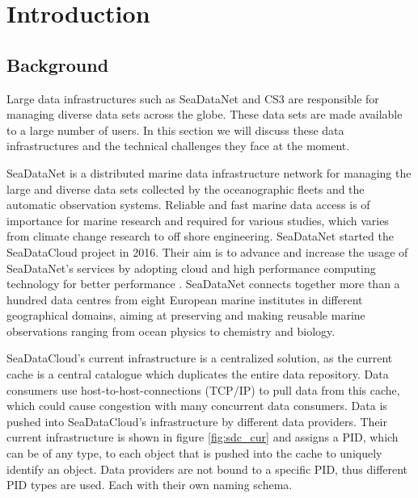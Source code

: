 \section{Introduction}

\subsection{Background}
\label{introduction-background}

Large data infrastructures such as SeaDataNet and CS3 are responsible for managing diverse data sets across the globe. These data sets are made available to a large number of users. In this section we will discuss these data infrastructures and the technical challenges they face at the moment.

SeaDataNet is a distributed marine data infrastructure network for managing the large and diverse data sets collected by the oceanographic fleets and the automatic observation systems. Reliable and fast marine data access is of importance for marine research and required for various studies, which varies from climate change research to off shore engineering. SeaDataNet started the SeaDataCloud project in 2016. Their aim is to advance and increase the usage of SeaDataNet's services by adopting cloud and high performance computing technology for better performance \cite{sdc}. SeaDataNet connects together more than a hundred data centres from eight European marine institutes in different geographical domains, aiming at preserving and making reusable marine observations ranging from ocean physics to chemistry and biology.

SeaDataCloud's current infrastructure is a centralized solution, as the current cache is a central catalogue which duplicates the entire data repository. Data consumers use host-to-host-connections (TCP/IP) to pull data from this cache, which could cause congestion with many concurrent data consumers. Data is pushed into SeaDataCloud's infrastructure by different data providers. Their current infrastructure is shown in figure \ref{fig:sdc_cur} and assigns a PID, which can be of any type, to each object that is pushed into the cache to uniquely identify an object. Data providers are not bound to a specific PID, thus different PID types are used. Each with their own naming schema.

